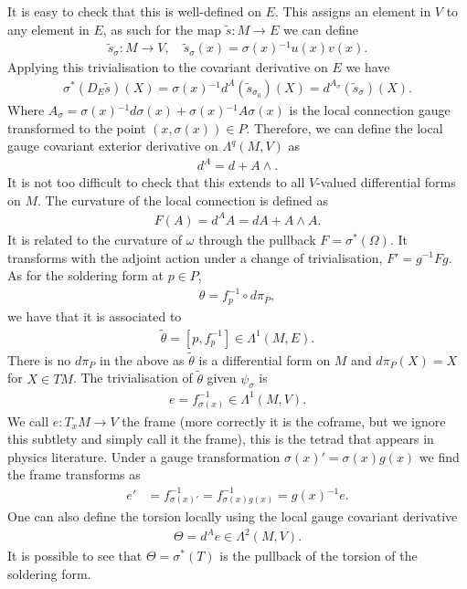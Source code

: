 \documentclass[10pt]{report}
\theoremstyle{definition}
\begin{document}
It is easy to check that this is well-defined on $E$. This assigns an element in $V$ to any element in $E$, as such for the map $\tilde{s} : M \rightarrow E$ we can define 
\begin{align}
    \tilde{s}_\sigma : M \rightarrow V, \quad \tilde{s}_\sigma(x) = \sigma(x){}^{-1} u(x) v(x).
\end{align}
Applying this trivialisation to the covariant derivative on $E$ we have 
\begin{align}
    \sigma^* (D_E \tilde{s})(X) = \sigma(x){}^{-1} d^{A}(\tilde{s}_{\sigma_0})(X) = d^{A_\sigma}(\tilde{s}_{\sigma})(X).
\end{align}
Where $A_\sigma = \sigma(x){}^{-1} d\sigma(x) + \sigma(x){}^{-1} A \sigma(x)$ is the local connection gauge transformed to the point $(x,\sigma(x)) \in P$. Therefore, we can define the local gauge covariant exterior derivative on $\Lambda^q(M,V)$ as 
\begin{align}
    d^A = d + A \wedge.
\end{align}
It is not too difficult to check that this extends to all $V$-valued differential forms on $M$. The curvature of the local connection is defined as
\begin{align}
    F(A) = d^A A = dA + A \wedge A.
\end{align}
It is related to the curvature of $\omega$ through the pullback $F = \sigma^*(\Omega)$. It transforms with the adjoint action under a change of trivialisation, $F' = g^{-1} F g$. As for the soldering form at $p \in P$,
\begin{align}
    \theta = f_p^{-1} \circ d\pi_P,
\end{align}
we have that it is associated to 
\begin{align}
    \tilde{\theta} = [p,f_p^{-1}] \in \Lambda^1(M,E).
\end{align}
There is no $d\pi_P$ in the above as $\tilde{\theta}$ is a differential form on $M$ and $d\pi_P(X) = X$ for $X \in TM$. The trivialisation of $\tilde{\theta}$ given $\psi_\sigma$ is
\begin{align}
    e = f_{\sigma(x)}^{-1} \in \Lambda^1(M,V).
\end{align}
We call $e : T_x M \rightarrow V$ the frame (more correctly it is the coframe, but we ignore this subtlety and simply call it the frame), this is the tetrad that appears in physics literature. Under a gauge transformation $\sigma(x)' = \sigma(x) g(x)$ we find the frame transforms as 
\begin{align}
    e' & = f_{\sigma(x)'}^{-1} = f_{\sigma(x) g(x)}^{-1} = g(x){}^{-1} e.
\end{align}
One can also define the torsion locally using the local gauge covariant derivative 
\begin{align}
    \Theta = d^A e \in \Lambda^2(M,V).
\end{align}
It is possible to see that $\Theta = \sigma^*(T)$ is the pullback of the torsion of the soldering form.
\end{document}
